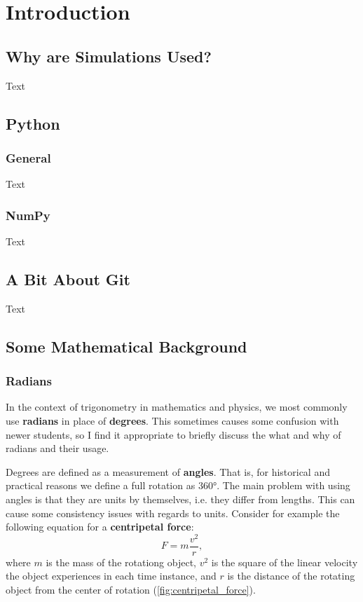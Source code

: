\chapter{Introduction}

\section{Why are Simulations Used?}
Text

\section{Python}
\subsection{General}
Text
\subsection{NumPy}
Text

\section{A Bit About Git}
Text

\section{Some Mathematical Background}
\subsection{Radians}
In the context of trigonometry in mathematics and physics, we most commonly use \textbf{radians} in place of \textbf{degrees}. This sometimes causes some confusion with newer students, so I find it appropriate to briefly discuss the what and why of radians and their usage.

Degrees are defined as a measurement of \textbf{angles}. That is, for historical and practical reasons we define a full rotation as $\ang{360}$. The main problem with using angles is that they are units by themselves, i.e. they differ from lengths. This can cause some consistency issues with regards to units. Consider for example the following equation for a \textbf{centripetal force}:
\begin{equation}
	F = m\frac{v^{2}}{r},
	\label{eq:centripetal_force_velocity}
\end{equation}
where $m$ is the mass of the rotationg object, $v^{2}$ is the square of the linear velocity the object experiences in each time instance, and $r$ is the distance of the rotating object from the center of rotation (\autoref{fig:centripetal_force}).


